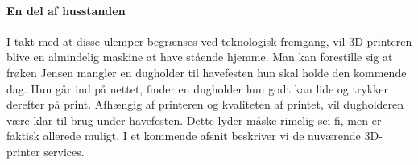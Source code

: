 \paragraph{En del af husstanden} %
\label{par:en_del_af_husstanden}


I takt med at disse ulemper begrænses ved teknologisk fremgang, vil 3D-printeren blive en almindelig maskine at have stående hjemme. Man kan forestille sig at frøken Jensen mangler en dugholder til havefesten hun skal holde den kommende dag. Hun går ind på nettet, finder en dugholder hun godt kan lide og trykker derefter på print. Afhængig af printeren og kvaliteten af printet, vil dugholderen være klar til brug under havefesten. Dette lyder måske rimelig sci-fi, men er faktisk allerede muligt. I et kommende afsnit beskriver vi de nuværende 3D-printer services.


